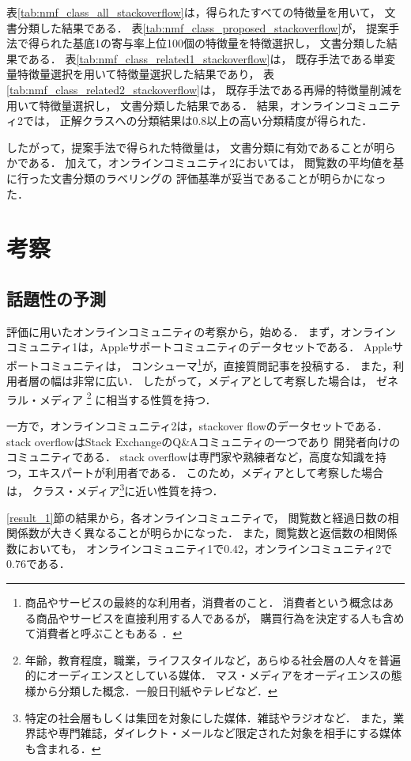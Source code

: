 \documentclass[12pt,a4paper,twocolumn,twoside]{jsik}
\begin{document}
表\ref{tab:nmf_class_all_stackoverflow}は，得られたすべての特徴量を用いて，
文書分類した結果である．
%
表\ref{tab:nmf_class_proposed_stackoverflow}が，
提案手法で得られた基底1の寄与率上位100個の特徴量を特徴選択し，
文書分類した結果である．
%
表\ref{tab:nmf_class_related1_stackoverflow}は，
既存手法である単変量特徴量選択を用いて特徴量選択した結果であり，
%
表\ref{tab:nmf_class_related2_stackoverflow}は，
既存手法である再帰的特徴量削減を用いて特徴量選択し，
文書分類した結果である．
%
結果，オンラインコミュニティ2では，
正解クラスへの分類結果は$0.8$以上の高い分類精度が得られた．

\newpage
したがって，提案手法で得られた特徴量は，
文書分類に有効であることが明らかである．
%
加えて，オンラインコミュニティ2においては，
閲覧数の平均値を基に行った文書分類のラベリングの
評価基準が妥当であることが明らかになった．

\section{考察}
\subsection{話題性の予測}
評価に用いたオンラインコミュニティの考察から，始める．
%
まず，オンラインコミュニティ1は，Appleサポートコミュニティのデータセットである．
%
Appleサポートコミュニティは，
コンシューマ\footnote{
商品やサービスの最終的な利用者，消費者のこと．
消費者という概念はある商品やサービスを直接利用する人であるが，
購買行為を決定する人も含めて消費者と呼ぶこともある
\cite{book_media}．
}が，直接質問記事を投稿する．
また，利用者層の幅は非常に広い．
%
したがって，メディアとして考察した場合は，
ゼネラル・メディア
\footnote{
年齢，教育程度，職業，ライフスタイルなど，あらゆる社会層の人々を普遍的にオーディエンスとしている媒体．
マス・メディアをオーディエンスの態様から分類した概念．一般日刊紙やテレビなど\cite{book_media}．
}
に相当する性質を持つ．

一方で，オンラインコミュニティ2は，stackover flowのデータセットである．
stack overflowはStack ExchangeのQ\&Aコミュニティの一つであり
開発者向けのコミュニティである．
stack overflowは専門家や熟練者など，高度な知識を持つ，エキスパートが利用者である．
このため，メディアとして考察した場合は，
クラス・メディア\footnote{
特定の社会層もしくは集団を対象にした媒体．雑誌やラジオなど\cite{book_media}．
また，業界誌や専門雑誌，ダイレクト・メールなど限定された対象を相手にする媒体も含まれる．}に近い性質を持つ．

\ref{result_1}節の結果から，各オンラインコミュニティで，
閲覧数と経過日数の相関係数が大きく異なることが明らかになった．
%
また，閲覧数と返信数の相関係数においても，
オンラインコミュニティ1で$0.42$，オンラインコミュニティ2で$0.76$である．
\end{document}
